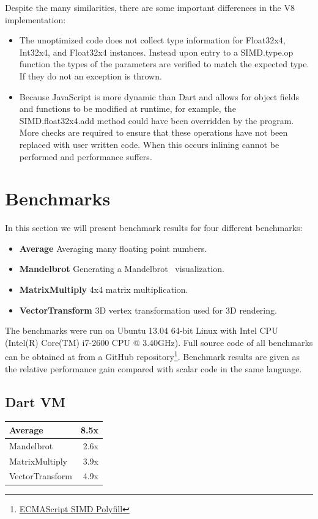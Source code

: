 \documentclass[preprint]{sigplanconf}
\begin{document}
Despite the many similarities, there are some important differences in the V8 implementation:

\begin{itemize}
\item
The unoptimized code does not collect type information for Float32x4, Int32x4,
and Float32x4 instances. Instead upon entry to a SIMD.type.op function the types
of the parameters are verified to match the expected type. If they do not an
exception is thrown.

\item
Because JavaScript is more dynamic than Dart and allows for object fields and
functions to be modified at runtime, for example, the SIMD.float32x4.add method
could have been overridden by the program. More checks are required to ensure
that these operations have not been replaced with user written code. When this
occurs inlining cannot be performed and performance suffers.
\end{itemize}

\section{Benchmarks}

In this section we will present benchmark results for four different benchmarks:

\begin{itemize}

\item
\textbf{Average} Averaging many floating point numbers.

\item
\textbf{Mandelbrot} Generating a Mandelbrot~\cite{mandelbrot} visualization.

\item
\textbf{MatrixMultiply} 4x4 matrix multiplication.

\item
\textbf{VectorTransform} 3D vertex transformation used for 3D rendering.
\end{itemize}

The benchmarks were run on Ubuntu 13.04 64-bit Linux with Intel CPU (Intel(R)
Core(TM) i7-2600 CPU @ 3.40GHz). Full source code of all benchmarks can be
obtained at from a GitHub repository\footnote{\href{https://github.com/johnmccut
chan/ecmascript_simd/}{ECMAScript SIMD Polyfill}}. Benchmark results are given
as the relative performance gain compared with scalar code in the same language.

\subsection{Dart VM}
\begin{tabular}{|l|r|}
\hline
 Average & 8.5x \\
 \hline
 Mandelbrot & 2.6x \\
 \hline
 MatrixMultiply & 3.9x \\
 \hline
 VectorTransform & 4.9x \\
 \hline
\end{tabular}
\end{document}

